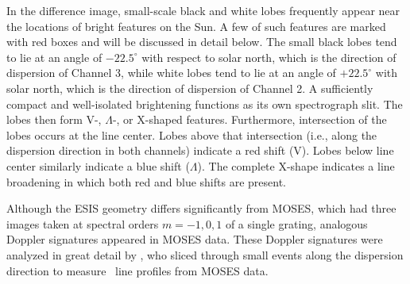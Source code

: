 \documentclass[linenumbers,trackchanges]{aastex63}
\begin{document}
    	
In the difference image, small-scale black and white lobes frequently appear near the locations of bright features on the Sun. A few of such features are marked with red boxes and will be discussed in detail below.  
    	The small black lobes tend to lie at an angle of $-22.5^\circ$ with respect to solar north, which is the direction of dispersion of Channel 3, while white lobes tend to lie at an angle of $+22.5^\circ$ with solar north, which is the direction of dispersion of Channel 2. A sufficiently compact and well-isolated brightening functions as its own spectrograph slit. 
    	The lobes then form V-, $\Lambda$-, or X-shaped features. 
    	Furthermore, intersection of the lobes occurs at the line center. 
    	Lobes above that intersection (i.e., along the dispersion direction in both channels) indicate a red shift (V). 
    	Lobes below line center similarly indicate a blue shift ($\Lambda$). The complete X-shape indicates a line broadening in which both red and blue shifts are present.
    	
    	Although the ESIS geometry differs significantly from MOSES, which had three images taken at spectral orders $m=-1, 0, 1$
    	of a single grating, analogous Doppler signatures appeared in MOSES data. These Doppler signatures were analyzed in great detail by \citet{Rust2019}, who sliced through small events along the dispersion direction to measure \heii \ line profiles from MOSES data.
\end{document}
